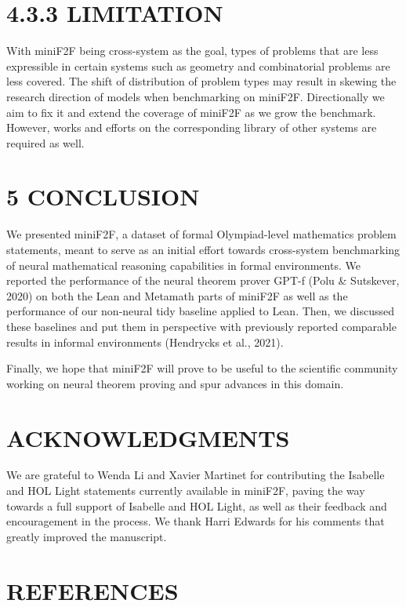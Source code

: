 \documentclass[
]{article}
\begin{document}
\section{4.3.3 LIMITATION}\label{limitation}

With miniF2F being cross-system as the goal, types of problems that are
less expressible in certain systems such as geometry and combinatorial
problems are less covered. The shift of distribution of problem types
may result in skewing the research direction of models when benchmarking
on miniF2F. Directionally we aim to fix it and extend the coverage of
miniF2F as we grow the benchmark. However, works and efforts on the
corresponding library of other systems are required as well.

\section{5 CONCLUSION}\label{conclusion}

We presented miniF2F, a dataset of formal Olympiad-level mathematics
problem statements, meant to serve as an initial effort towards
cross-system benchmarking of neural mathematical reasoning capabilities
in formal environments. We reported the performance of the neural
theorem prover GPT-f (Polu \& Sutskever, 2020) on both the Lean and
Metamath parts of miniF2F as well as the performance of our non-neural
tidy baseline applied to Lean. Then, we discussed these baselines and
put them in perspective with previously reported comparable results in
informal environments (Hendrycks et al., 2021).

Finally, we hope that miniF2F will prove to be useful to the scientific
community working on neural theorem proving and spur advances in this
domain.

\section{ACKNOWLEDGMENTS}\label{acknowledgments}

We are grateful to Wenda Li and Xavier Martinet for contributing the
Isabelle and HOL Light statements currently available in miniF2F, paving
the way towards a full support of Isabelle and HOL Light, as well as
their feedback and encouragement in the process. We thank Harri Edwards
for his comments that greatly improved the manuscript.

\section{REFERENCES}\label{references}
\end{document}
